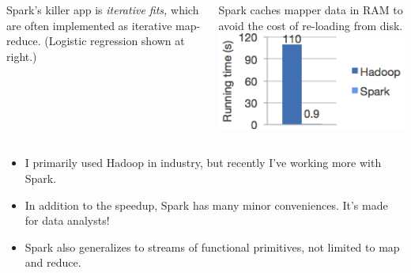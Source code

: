 \documentclass{beamer}
\begin{document}
\begin{frame}{}
\begin{columns}
Spark's killer app is {\it iterative fits,} which are often implemented as iterative map-reduce. (Logistic regression shown at right.)

\vspace{0.2 cm}
Spark caches mapper data in RAM to avoid the cost of re-loading from disk.
\includegraphics[width=\linewidth]{spark_time.png}
\end{columns}

\vfill
\begin{itemize}
\item I primarily used Hadoop in industry, but recently I've working more with Spark.
\item In addition to the speedup, Spark has many minor conveniences. It's made for data analysts!
\item Spark also generalizes to streams of functional primitives, not limited to map and reduce.
\end{itemize}
\end{frame}
\end{document}
